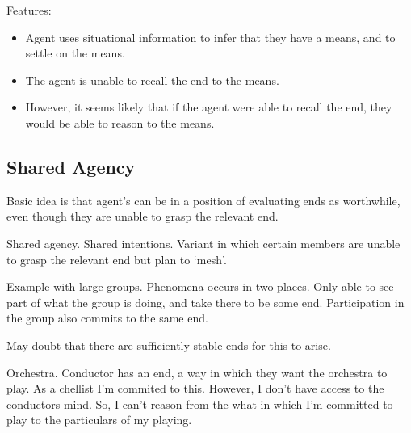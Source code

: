 \documentclass[10pt]{article}
\begin{document}
Features:
\begin{itemize}[noitemsep]
\item Agent uses situational information to infer that they have a means, and to settle on the means.
\item The agent is unable to recall the end to the means.
\item However, it seems likely that if the agent were able to recall the end, they would be able to reason to the means.
\end{itemize}



\subsection{Shared Agency}
\label{sec:shared-agency}

Basic idea is that agent's can be in a position of evaluating ends as worthwhile, even though they are unable to grasp the relevant end.

Shared agency.
Shared intentions.
Variant in which certain members are unable to grasp the relevant end but plan to `mesh'.

Example with large groups.
Phenomena occurs in two places.
Only able to see part of what the group is doing, and take there to be some end.
Participation in the group also commits to the same end.

May doubt that there are sufficiently stable ends for this to arise.

Orchestra.
Conductor has an end, a way in which they want the orchestra to play.
As a chellist I'm commited to this.
However, I don't have access to the conductors mind.
So, I can't reason from the what in which I'm committed to play to the particulars of my playing.

\newpage
\end{document}
